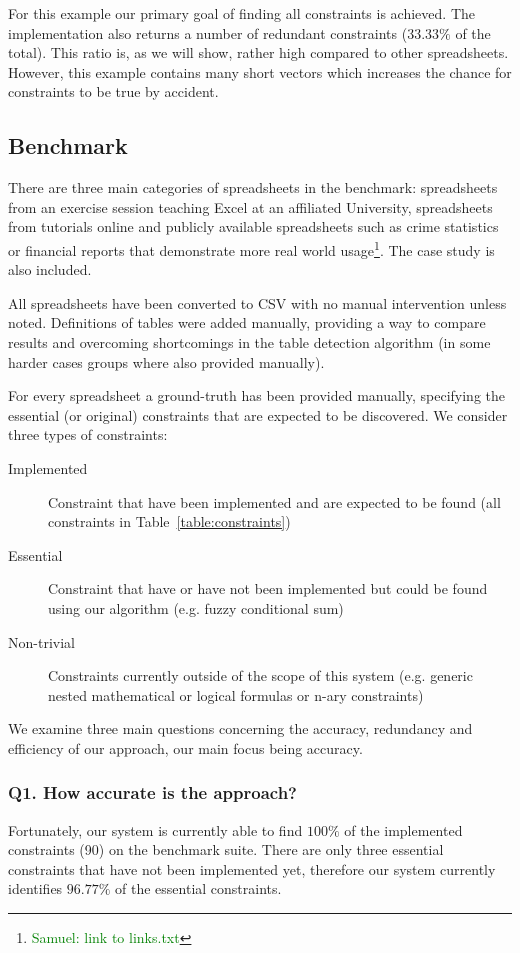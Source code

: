 \documentclass{ecai}
\newcommand{\samuel}[1]{\textcolor{green}{{\sc Samuel:} #1}\xspace}
\begin{document}
For this example our primary goal of finding all constraints is achieved.
The implementation also returns a number of redundant constraints ($33.33\%$ of the total).
This ratio is, as we will show, rather high compared to other spreadsheets.
However, this example contains many short vectors which increases the chance for constraints to be true by accident.

\subsection{Benchmark}
There are three main categories of spreadsheets in the benchmark: spreadsheets from an exercise session teaching Excel at an affiliated University, spreadsheets from tutorials online and publicly available spreadsheets such as crime statistics or financial reports that demonstrate more real world usage\footnote{\samuel{link to links.txt}}.
The case study is also included.

All spreadsheets have been converted to CSV with no manual intervention unless noted.
Definitions of tables were added manually, providing a way to compare results and overcoming shortcomings in the table detection algorithm (in some harder cases groups where also provided manually).

For every spreadsheet a ground-truth has been provided manually, specifying the essential (or original) constraints that are expected to be discovered.
We consider three types of constraints:
\begin{description}
  \item[Implemented] Constraint that have been implemented and are expected to be found (all constraints in Table~\ref{table:constraints})
  \item[Essential] Constraint that have or have not been implemented but could be found using our algorithm (e.g. fuzzy conditional sum)
  \item[Non-trivial] Constraints currently outside of the scope of this system (e.g. generic nested mathematical or logical formulas or n-ary constraints)
\end{description}

We examine three main questions concerning the accuracy, redundancy and efficiency of our approach, our main focus being accuracy.

\subsubsection*{Q1. How accurate is the approach?}
Fortunately, our system is currently able to find $100\%$ of the implemented constraints (90) on the benchmark suite.
There are only three essential constraints that have not been implemented yet, therefore our system currently identifies $96.77\%$ of the essential constraints.
\end{document}
